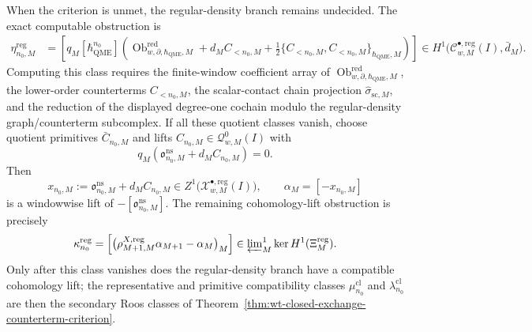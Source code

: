 \begin{prop}
  When the criterion is unmet, the regular-density branch remains
  undecided.  The exact computable obstruction is
  \[
  \begin{aligned}
    \eta^{\mathrm{reg}}_{n_0,M}
      &=
    \left[
      q_M[\hbar_{\mathrm{QME}}^{n_0}]\left(
        \operatorname{Ob}^{\mathrm{red}}_{w,\partial,\hbar_{\mathrm{QME}},M}
        +d_MC_{<n_0,M}
        +\frac12\{C_{<n_0,M},C_{<n_0,M}\}_{\hbar_{\mathrm{QME}},M}
      \right)
    \right]
      \in
    H^1\bigl(\mathcal C^{\bullet,\mathrm{reg}}_{w,M}(I),\bar d_M\bigr).
  \end{aligned}
  \]
  Computing this class requires the finite-window coefficient array of
  \(\operatorname{Ob}^{\mathrm{red}}_{w,\partial,\hbar_{\mathrm{QME}},M}\), the lower-order
  counterterms \(C_{<n_0,M}\), the scalar-contact chain projection
  \(\widehat\sigma_{\mathrm{sc},M}\), and the reduction of the displayed
  degree-one cochain modulo the regular-density graph/counterterm
  subcomplex.  If all these quotient classes vanish, choose quotient
  primitives \(\bar C_{n_0,M}\) and lifts \(C_{n_0,M}\in
  \mathcal Q^0_{w,M}(I)\) with
  \[
    q_M(\mathfrak o^{\mathrm{ns}}_{n_0,M}+d_MC_{n_0,M})=0.
  \]
  Then
  \[
    x_{n_0,M}:=
    \mathfrak o^{\mathrm{ns}}_{n_0,M}+d_MC_{n_0,M}
      \in
    Z^1\bigl(\mathcal X^{\bullet,\mathrm{reg}}_{w,M}(I)\bigr),
    \qquad
    \alpha_M=[-x_{n_0,M}]
  \]
  is a windowwise lift of
  \(-[\mathfrak o^{\mathrm{ns}}_{n_0,M}]\).  The remaining
  cohomology-lift obstruction is precisely
  \[
    \kappa^{\mathrm{reg}}_{n_0}
      =
    \left[
      \bigl(
        \rho^{X,\mathrm{reg}}_{M+1,M}\alpha_{M+1}-\alpha_M
      \bigr)_M
    \right]
      \in
    \varprojlim\nolimits^1_M
    \ker H^1(\Xi^{\mathrm{reg}}_M).
  \]
  Only after this class vanishes does the regular-density branch have a
  compatible cohomology lift; the representative and primitive
  compatibility classes
  \(\mu^{\mathrm{cl}}_{n_0}\) and \(\lambda^{\mathrm{cl}}_{n_0}\) are then
  the secondary Roos classes of
  Theorem~\ref{thm:wt-closed-exchange-counterterm-criterion}.
\end{prop}


